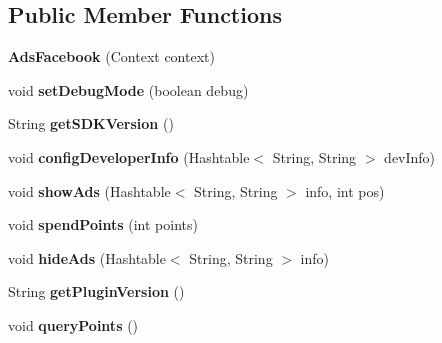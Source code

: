 \subsection*{Public Member Functions}
\begin{DoxyCompactItemize}
\item 
\mbox{\label{classorg_1_1cocos2dx_1_1plugin_1_1AdsFacebook_aa359b4edd7bb518d5d6d127de4b5ab2a}} 
{\bfseries Ads\+Facebook} (Context context)
\item 
\mbox{\label{classorg_1_1cocos2dx_1_1plugin_1_1AdsFacebook_ab756f0fecaa63b52aa18f5324ec8527e}} 
void {\bfseries set\+Debug\+Mode} (boolean debug)
\item 
\mbox{\label{classorg_1_1cocos2dx_1_1plugin_1_1AdsFacebook_acecdf354f9d0af5ee994705c539e63f8}} 
String {\bfseries get\+S\+D\+K\+Version} ()
\item 
\mbox{\label{classorg_1_1cocos2dx_1_1plugin_1_1AdsFacebook_a3bf78867683f0b61ca54d3ffadecfe3b}} 
void {\bfseries config\+Developer\+Info} (Hashtable$<$ String, String $>$ dev\+Info)
\item 
\mbox{\label{classorg_1_1cocos2dx_1_1plugin_1_1AdsFacebook_a58ca2f21fb1648d056cb4267ad564120}} 
void {\bfseries show\+Ads} (Hashtable$<$ String, String $>$ info, int pos)
\item 
\mbox{\label{classorg_1_1cocos2dx_1_1plugin_1_1AdsFacebook_a96f863b5aa1d46d42f83255e1da37611}} 
void {\bfseries spend\+Points} (int points)
\item 
\mbox{\label{classorg_1_1cocos2dx_1_1plugin_1_1AdsFacebook_ad627ef339d376866f2397c8d381ea3ea}} 
void {\bfseries hide\+Ads} (Hashtable$<$ String, String $>$ info)
\item 
\mbox{\label{classorg_1_1cocos2dx_1_1plugin_1_1AdsFacebook_a6df99952daf299626fd1e20edf340154}} 
String {\bfseries get\+Plugin\+Version} ()
\item 
\mbox{\label{classorg_1_1cocos2dx_1_1plugin_1_1AdsFacebook_a98abd58971a7f3cd5975a9fae0cb17f4}} 
void {\bfseries query\+Points} ()
\end{DoxyCompactItemize}
